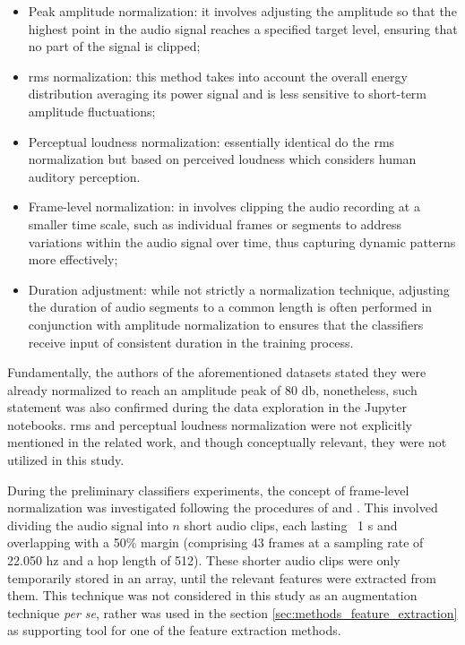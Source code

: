  \begin{itemize}
    \item Peak amplitude normalization: it involves adjusting the amplitude so that the highest point in the audio signal reaches a specified target level, ensuring that no part of the signal is clipped;
    \item \gls{rms} normalization: this method takes into account the overall energy distribution averaging its power signal and is less sensitive to short-term amplitude fluctuations;
    \item Perceptual loudness normalization: essentially identical do the \gls{rms} normalization but based on perceived loudness which considers human auditory perception.
    \item Frame-level normalization: in involves clipping the audio recording at a smaller time scale, such as individual frames or segments to address variations within the audio signal over time, thus capturing dynamic patterns more effectively;
    \item Duration adjustment: while not strictly a normalization technique, adjusting the duration of audio segments to a common length is often performed in conjunction with amplitude normalization to ensures that the classifiers receive input of consistent duration in the training process.
\end{itemize}

Fundamentally, the authors of the aforementioned datasets stated they were already normalized to reach an amplitude peak of 80 \gls{db}, nonetheless, such statement was also confirmed during the data exploration in the Jupyter notebooks. \gls{rms} and perceptual loudness normalization were not explicitly mentioned in the related work, and though conceptually relevant, they were not utilized in this study.

During the preliminary classifiers experiments, the concept of frame-level normalization was investigated following the procedures of \textcite{Silva2019} and \textcite{Lhoest2021}. This involved dividing the audio signal into $n$ short audio clips, each lasting ~1 \gls{s} and overlapping with a 50\% margin (comprising 43 frames at a sampling rate of 22.050 \gls{hz} and a hop length of 512). These shorter audio clips were only temporarily stored in an array, until the relevant features were extracted from them. This technique was not considered in this study as an augmentation technique \textit{per se}, rather was used in the section \ref{sec:methods_feature_extraction} as supporting tool for one of the feature extraction methods.

